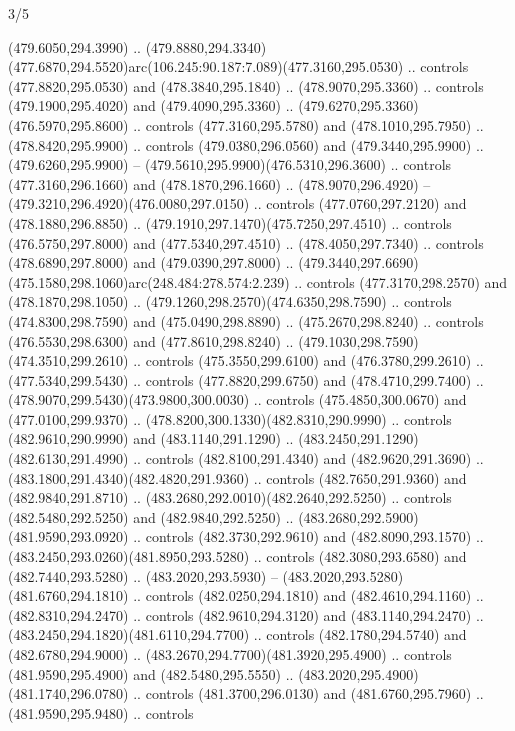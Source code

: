\begin{flagdescription}{3/5}
\begin{scope}[shift={(0.5\flaglength,0.5\flagwidth)},scale=\flagwidth/1075]
\begin{scope}[y=0.80pt, x=0.80pt, yscale=-2.37, xscale=2.37,xshift=-402,yshift=-230.4]
  (479.6050,294.3990) ..
  (479.8880,294.3340)(477.6870,294.5520)arc(106.245:90.187:7.089)(477.3160,295.0530)
  .. controls (477.8820,295.0530) and (478.3840,295.1840) .. (478.9070,295.3360)
  .. controls (479.1900,295.4020) and (479.4090,295.3360) ..
  (479.6270,295.3360)(476.5970,295.8600) .. controls (477.3160,295.5780) and
  (478.1010,295.7950) .. (478.8420,295.9900) .. controls (479.0380,296.0560) and
  (479.3440,295.9900) .. (479.6260,295.9900) --
  (479.5610,295.9900)(476.5310,296.3600) .. controls (477.3160,296.1660) and
  (478.1870,296.1660) .. (478.9070,296.4920) --
  (479.3210,296.4920)(476.0080,297.0150) .. controls (477.0760,297.2120) and
  (478.1880,296.8850) .. (479.1910,297.1470)(475.7250,297.4510) .. controls
  (476.5750,297.8000) and (477.5340,297.4510) .. (478.4050,297.7340) .. controls
  (478.6890,297.8000) and (479.0390,297.8000) ..
  (479.3440,297.6690)(475.1580,298.1060)arc(248.484:278.574:2.239) .. controls
  (477.3170,298.2570) and (478.1870,298.1050) ..
  (479.1260,298.2570)(474.6350,298.7590) .. controls (474.8300,298.7590) and
  (475.0490,298.8890) .. (475.2670,298.8240) .. controls (476.5530,298.6300) and
  (477.8610,298.8240) .. (479.1030,298.7590)(474.3510,299.2610) .. controls
  (475.3550,299.6100) and (476.3780,299.2610) .. (477.5340,299.5430) .. controls
  (477.8820,299.6750) and (478.4710,299.7400) ..
  (478.9070,299.5430)(473.9800,300.0030) .. controls (475.4850,300.0670) and
  (477.0100,299.9370) .. (478.8200,300.1330)(482.8310,290.9990) .. controls
  (482.9610,290.9990) and (483.1140,291.1290) ..
  (483.2450,291.1290)(482.6130,291.4990) .. controls (482.8100,291.4340) and
  (482.9620,291.3690) .. (483.1800,291.4340)(482.4820,291.9360) .. controls
  (482.7650,291.9360) and (482.9840,291.8710) ..
  (483.2680,292.0010)(482.2640,292.5250) .. controls (482.5480,292.5250) and
  (482.9840,292.5250) .. (483.2680,292.5900)(481.9590,293.0920) .. controls
  (482.3730,292.9610) and (482.8090,293.1570) ..
  (483.2450,293.0260)(481.8950,293.5280) .. controls (482.3080,293.6580) and
  (482.7440,293.5280) .. (483.2020,293.5930) --
  (483.2020,293.5280)(481.6760,294.1810) .. controls (482.0250,294.1810) and
  (482.4610,294.1160) .. (482.8310,294.2470) .. controls (482.9610,294.3120) and
  (483.1140,294.2470) .. (483.2450,294.1820)(481.6110,294.7700) .. controls
  (482.1780,294.5740) and (482.6780,294.9000) ..
  (483.2670,294.7700)(481.3920,295.4900) .. controls (481.9590,295.4900) and
  (482.5480,295.5550) .. (483.2020,295.4900)(481.1740,296.0780) .. controls
  (481.3700,296.0130) and (481.6760,295.7960) .. (481.9590,295.9480) .. controls

\end{scope}
\end{scope}
\end{flagdescription}
